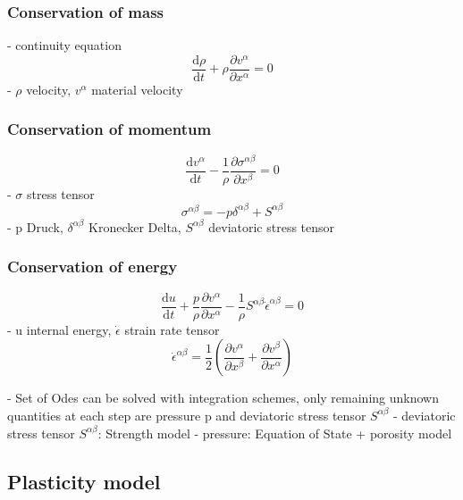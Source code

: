\subsubsection{Conservation of mass}
- continuity equation
\begin{equation}
    \frac{\mathrm {d}\rho }{\mathrm {d}t} + \rho \frac{\partial v^{\alpha} }{\partial x^\alpha} = 0
\end{equation}
- $\rho$ velocity, $v^{\alpha}$ material velocity

\subsubsection{Conservation of momentum}

\begin{equation}
    \frac{\mathrm {d} v^{\alpha} }{\mathrm {d}t} - \frac{1}{\rho} \frac{\partial \sigma^{\alpha \beta} }{\partial x^{\beta}} = 0
\end{equation}
- $\sigma$ stress tensor
\begin{equation}
    \sigma^{\alpha \beta} = - p\delta^{\alpha \beta} + S^{\alpha \beta}
\end{equation}
- p Druck, $\delta^{\alpha \beta}$ Kronecker Delta, $S^{\alpha \beta}$ deviatoric stress tensor

\subsubsection{Conservation of energy}
\begin{equation}
    \frac{\mathrm {d} u }{\mathrm {d}t} + \frac{p}{\rho} \frac{\partial v^{\alpha} }{\partial x^\alpha} - \frac{1}{\rho} S^{\alpha \beta} \dot{\epsilon}^{\alpha \beta} = 0
\end{equation}
- u internal energy, $\dot{\epsilon}$ strain rate tensor
\begin{equation}
    \dot{\epsilon}^{\alpha \beta} = \frac{1}{2} (\frac{\partial v^{\alpha} }{\partial x^\beta} + \frac{\partial v^{\beta} }{\partial x^\alpha})
\end{equation}

- Set of Odes can be solved with integration schemes, only remaining unknown quantities at each step are pressure p and deviatoric stress tensor $S^{\alpha \beta}$
- deviatoric stress tensor $S^{\alpha \beta}$: Strength model
- pressure: Equation of State + porosity model

\subsection{Plasticity model}

